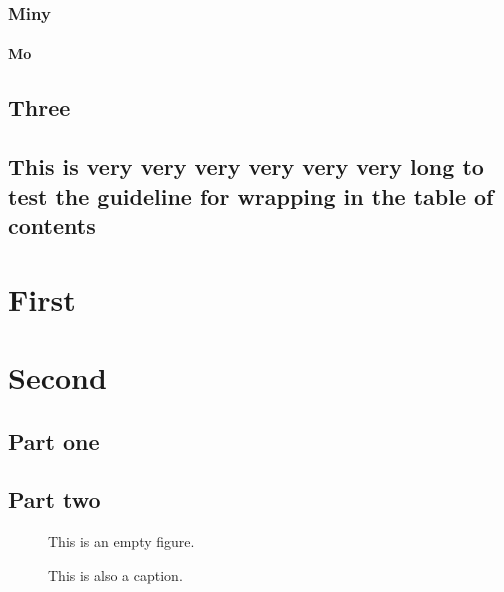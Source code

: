 \documentclass{utthesis}
\begin{document}
\subsection{Miny}
\subsubsection{Mo}
\section{Three}
\section{This is very very very very very very long to test the guideline for wrapping in the table of contents}



\begin{appendix}

\chapter{First}
\lipsum[3]

\chapter{Second}
\section{Part one}
\lipsum[3]
\section{Part two}
\begin{figure}
This is an empty figure.
\caption[That]{This is also a caption.}
\end{figure}

\end{appendix}

\backmatter

\printindex

\cleardoublepage
{}

\printbibliography
\end{document}
